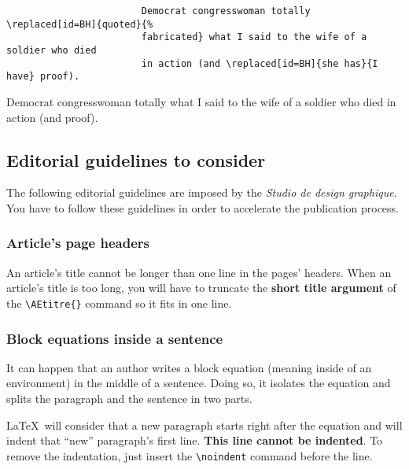 \documentclass[english]{article}
\newcommand{\cmd}[1]{%
	\texttt{\textbackslash#1\{\}}
}
\newcommand{\dec}[1]{%
	\texttt{\textbackslash#1}
}
\begin{document}
				\begin{shaded*}
					\begin{verbatim}
						Democrat congresswoman totally \replaced[id=BH]{quoted}{%
						fabricated} what I said to the wife of a soldier who died
						in action (and \replaced[id=BH]{she has}{I have} proof).
					\end{verbatim}
				\end{shaded*}
			
				\begin{leftbar}
					Democrat congresswoman totally  what I said to the wife of a soldier who died
					in action (and  proof).
				\end{leftbar}
			
		\subsection{Editorial guidelines to consider}
		
			The following editorial guidelines are imposed by the 
			\emph{Studio de design graphique}. You have to follow these guidelines
			in order to accelerate the publication process.
			
			\subsubsection{Article's page headers}
			
			An article's title cannot be longer than one line in the pages' headers.
			When an article's title is too long, you will have to truncate the 
			\textbf{short title argument} of the \cmd{AEtitre} command so it fits in
			one line.
			
			\subsubsection{Block equations inside a sentence}
			
			It can happen that an author writes a block equation (meaning inside of an environment) in the
			middle of a sentence. Doing so, it isolates the equation and splits the paragraph and the 
			sentence in two parts.
			
			\LaTeX\ will consider that a new paragraph starts right after the equation and will indent
			that ``new'' paragraph's first line. \textbf{This line cannot be indented}. To remove the
			indentation, just insert the \dec{noindent} command before the line.
			
\end{document}
